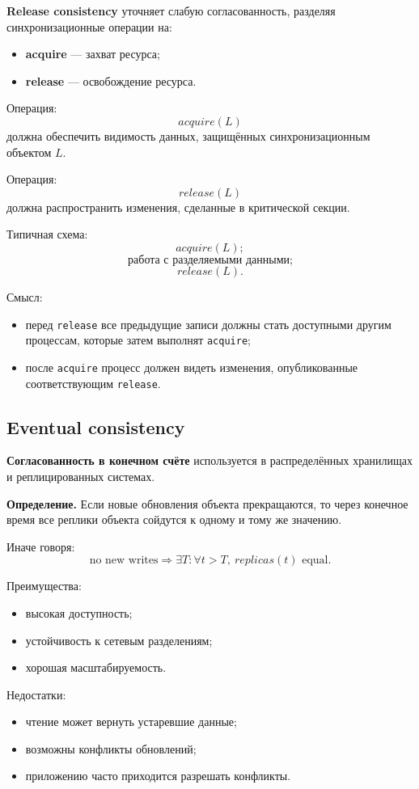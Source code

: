 \documentclass[12pt,a4paper]{article}
\begin{document}
\textbf{Release consistency} уточняет слабую согласованность, разделяя синхронизационные операции на:
\begin{itemize}
    \item \textbf{acquire} --- захват ресурса;
    \item \textbf{release} --- освобождение ресурса.
\end{itemize}

Операция:
\[
acquire(L)
\]
должна обеспечить видимость данных, защищённых синхронизационным объектом $L$.

Операция:
\[
release(L)
\]
должна распространить изменения, сделанные в критической секции.

Типичная схема:
\[
acquire(L);
\]
\[
\text{работа с разделяемыми данными;}
\]
\[
release(L).
\]

Смысл:
\begin{itemize}
    \item перед \texttt{release} все предыдущие записи должны стать доступными другим процессам, которые затем выполнят \texttt{acquire};
    \item после \texttt{acquire} процесс должен видеть изменения, опубликованные соответствующим \texttt{release}.
\end{itemize}

\subsection{Eventual consistency}

\textbf{Согласованность в конечном счёте} используется в распределённых хранилищах и реплицированных системах.

\textbf{Определение.}
Если новые обновления объекта прекращаются, то через конечное время все реплики объекта сойдутся к одному и тому же значению.

Иначе говоря:
\[
\text{no new writes} \Rightarrow \exists T: \forall t > T,\ replicas(t) \text{ equal}.
\]

Преимущества:
\begin{itemize}
    \item высокая доступность;
    \item устойчивость к сетевым разделениям;
    \item хорошая масштабируемость.
\end{itemize}

Недостатки:
\begin{itemize}
    \item чтение может вернуть устаревшие данные;
    \item возможны конфликты обновлений;
    \item приложению часто приходится разрешать конфликты.
\end{itemize}
\end{document}
